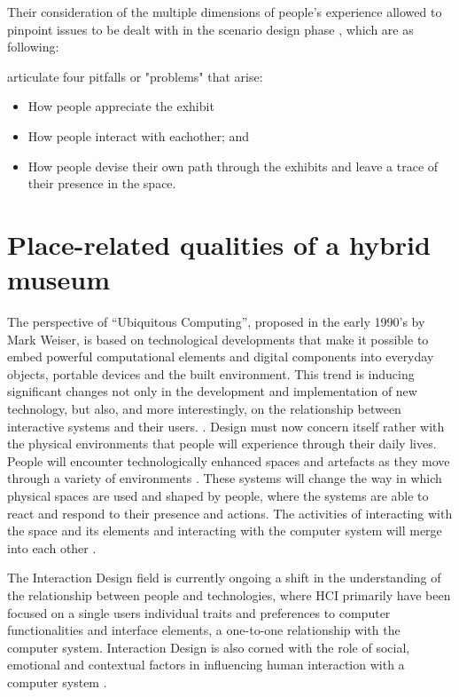 \break
Their consideration of the multiple dimensions of people's experience allowed to pinpoint issues to be dealt with in the scenario design phase \autocite[p. 178]{hybridplace_ciolfi}, which are as following:

\autocite[p. 168]{hybridplace_ciolfi} articulate four pitfalls or "problems" that arise: 
\begin{itemize}
    \item How people appreciate the exhibit
    \item How people interact with eachother; and
    \item How people devise their own path through the exhibits and leave a trace of their presence in the space.
\end{itemize}


\section{Place-related qualities of a hybrid museum}

The perspective of “Ubiquitous Computing”, proposed in the early 1990’s by Mark Weiser, is based on technological developments that make it possible to embed powerful computational elements and digital components into everyday objects, portable devices and the built environment. This trend is inducing significant changes not only in the development and implementation of new technology, but also, and more interestingly, on the relationship between interactive systems and their users. \autocite[p. 217]{ciolfi_space_2005}. Design must now concern itself rather with the physical environments that people will experience through their daily lives. People will encounter technologically enhanced spaces and artefacts as they move through a variety of environments \autocite[p. 217]{ciolfi_space_2005}. These systems will change the way in which physical spaces are used and shaped by people, where the systems are able to react and respond to their presence and actions. The activities of interacting with the space and its elements and interacting with the computer system will merge into each other \autocite[p. 217]{ciolfi_space_2005}. 

The Interaction Design field is currently ongoing a shift in the understanding of the relationship between people and technologies, where HCI primarily have been focused on a single users individual traits and preferences to computer functionalities and interface elements, a one-to-one relationship with the computer system. Interaction Design is also corned with the role of social, emotional and contextual factors in influencing human interaction with a computer system \autocite[p. 217]{ciolfi_space_2005}.

